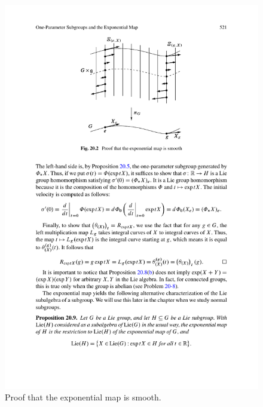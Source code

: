 \begin{figure}[htbp]
\centering
\includegraphics{pictures/exp-map-prop}
\caption{Proof that the exponential map is smooth.}
\end{figure}
